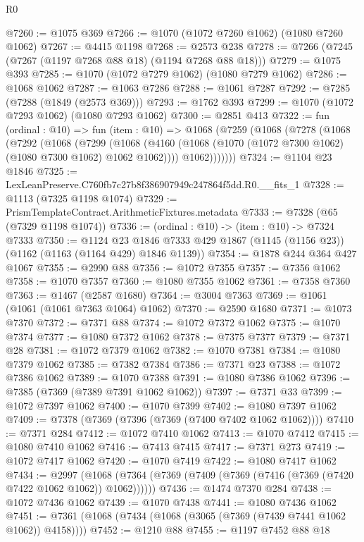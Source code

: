 \begin{lexlean}{R0}
\begin{coremodule}
@7260 := @1075 @369
@7266 := @1070 (@1072 @7260 @1062) (@1080 @7260 @1062)
@7267 := @4415 @1198
@7268 := @2573 @238
@7278 := @7266 (@7245 (@7267 (@1197 @7268 @88 @18) (@1194 @7268 @88 @18)))
@7279 := @1075 @393
@7285 := @1070 (@1072 @7279 @1062) (@1080 @7279 @1062)
@7286 := @1068 @1062
@7287 := @1063 @7286
@7288 := @1061 @7287
@7292 := @7285 (@7288 (@1849 (@2573 @369)))
@7293 := @1762 @393
@7299 := @1070 (@1072 @7293 @1062) (@1080 @7293 @1062)
@7300 := @2851 @413
@7322 := fun (ordinal : @10) =>
  fun (item : @10) =>
  @1068
    (@7259
      (@1068
        (@7278
          (@1068
            (@7292
              (@1068
                (@7299
                  (@1068
                    (@4160 (@1068 (@1070 (@1072 @7300 @1062) (@1080 @7300 @1062) @1062 @1062))))
                  @1062)))))))
@7324 := @1104 @23 @1846
@7325 := LexLeanPreserve.C760fb7c27b8f386907949c247864f5dd.R0.__fits_1
@7328 := @1113 (@7325 @1198 @1074)
@7329 := PrismTemplateContract.ArithmeticFixtures.metadata
@7333 := @7328 (@65 (@7329 @1198 @1074))
@7336 := (ordinal : @10) -> (item : @10) -> @7324 @7333
@7350 := @1124
    @23
    @1846
    @7333
    @429
    @1867
    (@1145 (@1156 @23))
    (@1162 (@1163 (@1164 @429) @1846 @1139))
@7354 := @1878 @244 @364 @427 @1067
@7355 := @2990 @88
@7356 := @1072 @7355
@7357 := @7356 @1062
@7358 := @1070 @7357
@7360 := @1080 @7355 @1062
@7361 := @7358 @7360
@7363 := @1467 (@2587 @1680)
@7364 := @3004 @7363
@7369 := @1061 (@1061 (@1061 @7363 @1064) @1062)
@7370 := @2590 @1680
@7371 := @1073 @7370
@7372 := @7371 @88
@7374 := @1072 @7372 @1062
@7375 := @1070 @7374
@7377 := @1080 @7372 @1062
@7378 := @7375 @7377
@7379 := @7371 @28
@7381 := @1072 @7379 @1062
@7382 := @1070 @7381
@7384 := @1080 @7379 @1062
@7385 := @7382 @7384
@7386 := @7371 @23
@7388 := @1072 @7386 @1062
@7389 := @1070 @7388
@7391 := @1080 @7386 @1062
@7396 := @7385 (@7369 (@7389 @7391 @1062 @1062))
@7397 := @7371 @33
@7399 := @1072 @7397 @1062
@7400 := @1070 @7399
@7402 := @1080 @7397 @1062
@7409 := @7378 (@7369 (@7396 (@7369 (@7400 @7402 @1062 @1062))))
@7410 := @7371 @284
@7412 := @1072 @7410 @1062
@7413 := @1070 @7412
@7415 := @1080 @7410 @1062
@7416 := @7413 @7415
@7417 := @7371 @273
@7419 := @1072 @7417 @1062
@7420 := @1070 @7419
@7422 := @1080 @7417 @1062
@7434 := @2997
    (@1068 (@7364 (@7369 (@7409 (@7369 (@7416 (@7369 (@7420 @7422 @1062 @1062)) @1062))))))
@7436 := @1474 @7370 @284
@7438 := @1072 @7436 @1062
@7439 := @1070 @7438
@7441 := @1080 @7436 @1062
@7451 := @7361 (@1068 (@7434 (@1068 (@3065 (@7369 (@7439 @7441 @1062 @1062)) @4158))))
@7452 := @1210 @88
@7455 := @1197 @7452 @88 @18

\end{coremodule}
\end{lexlean}
